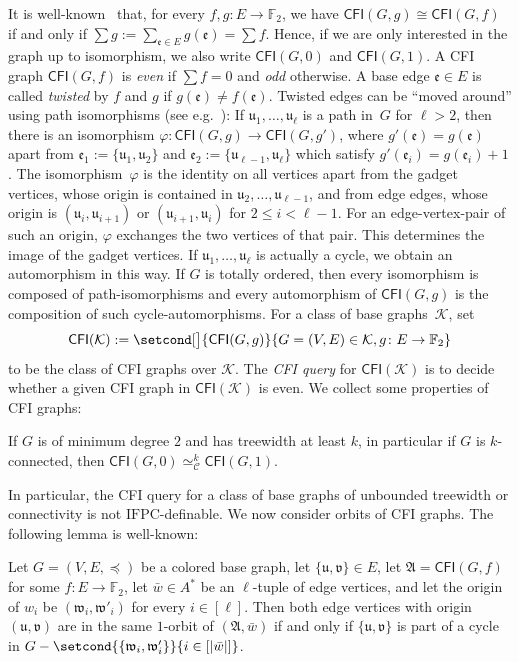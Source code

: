 \documentclass[]{lmcs}
\renewcommand{\phi}{\varphi}
\newcommand{\FF}{\mathbb{F}}
\newcommand{\defining}[1]{\emph{#1}}
\newcommand{\iso}{\cong}
\newcommand{\set}[1]{\lbrace #1 \rbrace}
\newcommand{\autoA}{\phi}
\newcommand{\tup}[1]{\bar{#1}}
\newcommand{\vertC}{w}
\newcommand{\spleq}{\preceq}
\newcommand{\StructA}{\mathfrak{A}}
\newcommand{\StructVA}{A}
\newcommand{\GraphClass}{\mathcal{K}}
\newcommand{\IFPC}{\ensuremath{\mathrm{IFPC}}}
\newcommand{\CFIsym}{\mathsf{CFI}}
\newcommand{\CFI}[1]{\CFIsym(#1)}
\newcommand{\bVertA}{\mathfrak{u}}
\newcommand{\bVertB}{\mathfrak{v}}
\newcommand{\bVertC}{\mathfrak{w}}
\newcommand{\bEdge}{\mathfrak{e}}
\newcommand{\kequiv}[1]{\simeq^#1_{\mathcal{C}}}
\begin{document}
It is well-known~\cite{CaiFI1992} that, for every $f,g \colon E \to \FF_2$,
we have $\CFI{G,g} \iso \CFI{G,f}$ if and only if $\sum g := \sum_{\bEdge\in E} g(\bEdge) = \sum f$.
Hence, if we are only interested in the graph up to isomorphism,
we also write $\CFI{G,0}$ and $\CFI{G,1}$.
A CFI graph $\CFI{G,f}$ is \defining{even} if ${\sum f = 0}$ 
and \defining{odd} otherwise.
A base edge $\bEdge \in E$ is called \defining{twisted} by $f$ and $g$ if ${g(\bEdge) \neq f(\bEdge)}$.
Twisted edges can be ``moved around'' using path isomorphisms (see e.g.~\cite{Lichter2023}):
If $\bVertA_1, \dots, \bVertA_\ell$ is a path in~$G$ for $\ell > 2$,
then there is an isomorphism $\autoA \colon \CFI{G,g} \to \CFI{G,g'}$,
where $g'(\bEdge) = g(\bEdge)$ apart from $\bEdge_1:=\set{\bVertA_1,\bVertA_2}$ and $\bEdge_2:= \set{\bVertA_{\ell-1}, \bVertA_\ell}$ which satisfy $g'(\bEdge_i) = g(\bEdge_i) +1$.
The isomorphism~$\autoA$ is the identity on all vertices apart from 
the gadget vertices, whose origin is contained in $\bVertA_2, \dots, \bVertA_{\ell-1}$, and from edge edges, whose origin is $(\bVertA_i,\bVertA_{i+1})$ or $(\bVertA_{i+1},\bVertA_{i})$ for $2\leq i < \ell-1$.
For an edge-vertex-pair of such an origin, $\autoA$ exchanges the two vertices of that pair.
This determines the image of the gadget vertices.
If $\bVertA_1, \dots, \bVertA_\ell$ is actually a cycle, we obtain an automorphism in this way.
If $G$ is totally ordered,
then every isomorphism is composed of path-isomorphisms
and
every automorphism of $\CFI{G,g}$ is the composition of such cycle-automorphisms.
For a class of base graphs~$\GraphClass$,
set
\[\CFI{\GraphClass} := \setcond[\big]{\CFI{G,g}}{G=(V,E) \in \GraphClass, g\colon E\to \FF_2}\]
to be the class of CFI graphs over $\GraphClass$.
The \defining{CFI query} for $\CFI{\GraphClass}$
is to decide whether a given CFI graph in $\CFI{\GraphClass}$ is even.
We collect some properties of CFI graphs:
\begin{lemC}
	\label{lem:k-connected-treewidth-CFI-equiv}
	If $G$ is of  minimum degree $2$ and has treewidth at least $k$,
	in particular if $G$ is $k$-connected,
	then $\CFI{G,0} \kequiv{k} \CFI{G,1}$.
\end{lemC}
In particular, the CFI query for a class of base graphs
of unbounded treewidth or connectivity is not \IFPC{}-definable.
We now consider orbits of CFI graphs.
The following lemma is well-known: 
\begin{lem}
	\label{lem:edge-vertices-same-orbit}
	Let $G=(V,E,\spleq)$ be a colored base graph,
	let $\set{\bVertA,\bVertB} \in E$,
	let $\StructA = \CFI{G, f}$ for some $f\colon E\to \FF_2$,
	let $\tup{\vertC} \in \StructVA^*$ be an $\ell$-tuple of edge vertices,
	and let the origin of $\vertC_i$ be $(\bVertC_i,\bVertC'_i)$ for every $i \in [\ell]$.
	Then both edge vertices with origin $(\bVertA,\bVertB)$ are in the same $1$-orbit of $(\StructA,\tup{\vertC})$
	if and only if $\set{\bVertA,\bVertB}$ is part of a cycle in $G - \setcond{\set{\bVertC_i,\bVertC'_i}}{i \in [|\tup{\vertC}|]}$.
\end{lem}
\end{document}
